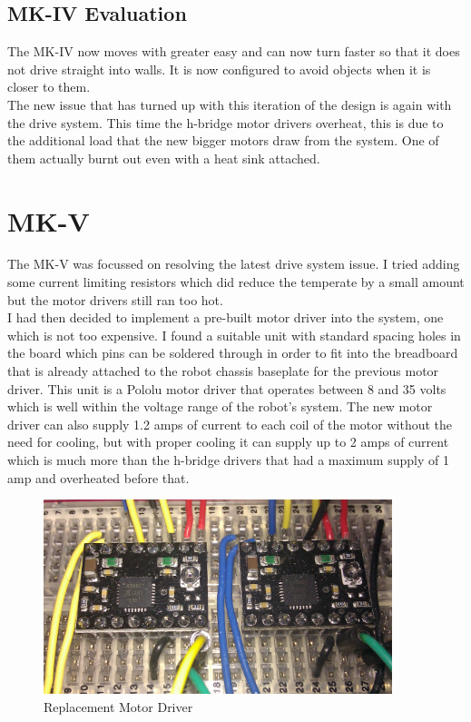 \subsection{MK-IV Evaluation}
The MK-IV now moves with greater easy and can now turn faster so that it does not drive straight into walls.  It is now configured to avoid objects when it is closer to them.
\\The new issue that has turned up with this iteration of the design is again with the drive system.  This time the h-bridge motor drivers overheat, this is due to the additional load that the new bigger motors draw from the system.  One of them actually burnt out even with a heat sink attached.
\section{MK-V}
The MK-V was focussed on resolving the latest drive system issue.  I tried adding some current limiting resistors which did reduce the temperate by a small amount but the motor drivers still ran too hot.
\\I had then decided to implement a pre-built motor driver into the system, one which is not too expensive.  I found a suitable unit with standard spacing holes in the board which pins can be soldered through in order to fit into the breadboard that is already attached to the robot chassis baseplate for the previous motor driver.  This unit is a Pololu motor driver that operates between 8 and 35 volts which is well within the voltage range of the robot's system.  The new motor driver can also supply 1.2 amps of current to each coil of the motor without the need for cooling, but with proper cooling it can supply up to 2 amps of current which is much more than the h-bridge drivers that had a maximum supply of 1 amp and overheated before that.
\begin{figure}[H]
\centering
        \includegraphics[width=4.0in]  {Images/pololu-motor-driver.jpg}
        \caption{Replacement Motor Driver}
        \label{Replacement Motor Driver}
\end{figure}
